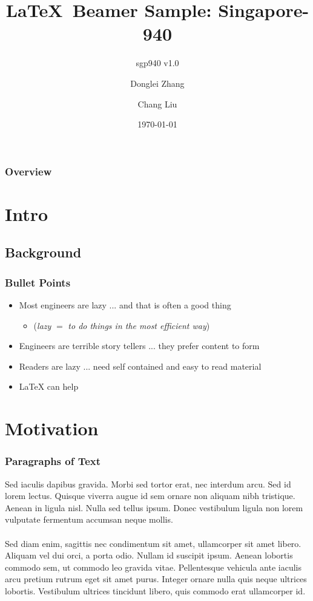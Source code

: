 \documentclass[10pt,aspectratio=32]{beamer}
\title{\LaTeX \ Beamer Sample: Singapore-940}
\subtitle{sgp940 v1.0}
\author{Donglei Zhang \and Chang Liu}
\institute{The Chinese University of Hong Kong}
\date{\today}
\begin{document}
\AtBeginSection[]{\frame{\sectionpage}} %

\begin{frame}
	\titlepage
\end{frame}

\begin{frame}
	\frametitle{Overview} 
	\vspace{-0.7cm}
	\tableofcontents  
\end{frame}

\section{Intro}
\subsection{Background}
\begin{frame}
\frametitle{Bullet Points}
\vspace{-0.3cm}

\begin{itemize}
	\item Most engineers are lazy ... and that is often a good thing
	\begin{itemize}
		\item (\textit{lazy} $=$ \textit{to do things in the most efficient way})
	\end{itemize}
	\item Engineers are terrible story tellers ... they prefer content to form
	\item Readers are lazy ... need self contained and easy to read material
	\item \LaTeX{} can help
\end{itemize}

 \end{frame}
 
 
\section{Motivation}
\begin{frame}
	\frametitle{Paragraphs of Text}
	\vspace{-0.8cm}
	Sed iaculis dapibus gravida. Morbi sed tortor erat, nec interdum arcu. Sed id lorem lectus. Quisque viverra augue id sem ornare non aliquam nibh tristique. Aenean in ligula nisl. Nulla sed tellus ipsum. Donec vestibulum ligula non lorem vulputate fermentum accumsan neque mollis.\\~\\
	
	Sed diam enim, sagittis nec condimentum sit amet, ullamcorper sit amet libero. Aliquam vel dui orci, a porta odio. Nullam id suscipit ipsum. Aenean lobortis commodo sem, ut commodo leo gravida vitae. Pellentesque vehicula ante iaculis arcu pretium rutrum eget sit amet purus. Integer ornare nulla quis neque ultrices lobortis. Vestibulum ultrices tincidunt libero, quis commodo erat ullamcorper id.
\end{frame}
 
\end{document}
